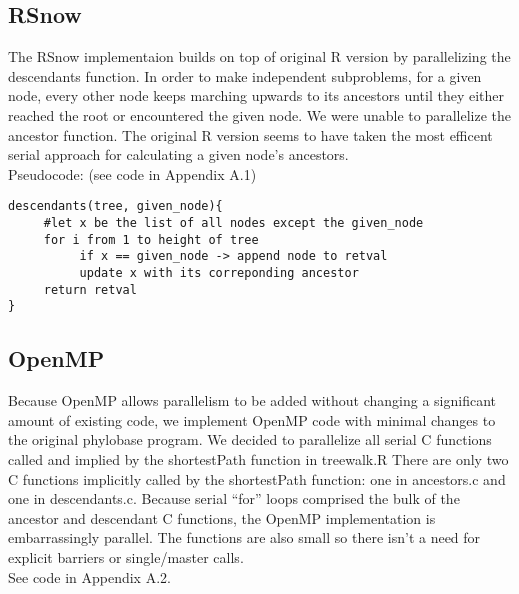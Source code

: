 \documentclass[11pt,letterpaper]{article}
\begin{document}
\subsection{RSnow}
The RSnow implementaion builds on top of original R version by parallelizing the descendants function. 
In order to make independent subproblems, for a given node, every other node keeps marching upwards to its ancestors until they either reached the root or encountered the given node. 
We were unable to parallelize the ancestor function. The original R version seems to have taken the most efficent serial approach for calculating a given node's ancestors. \\

Pseudocode: (see code in Appendix A.1)
\begin{lstlisting}[style=MyR]
descendants(tree, given_node){
     #let x be the list of all nodes except the given_node
     for i from 1 to height of tree
          if x == given_node -> append node to retval
          update x with its correponding ancestor
     return retval
}
\end{lstlisting}

\subsection{OpenMP}
Because OpenMP allows parallelism to be added without changing a significant amount of existing code, we implement OpenMP code with minimal changes to the original phylobase program. 
We decided to parallelize all serial C functions called and implied by the shortestPath function in treewalk.R
There are only two C functions implicitly called by the shortestPath function: one in ancestors.c and one in descendants.c. 
Because serial “for” loops comprised the bulk of the ancestor and descendant C functions, the OpenMP implementation is embarrassingly parallel. The functions are also small so there isn't a need for explicit barriers or single/master calls.
\\

See code in Appendix A.2.\\
\end{document}
